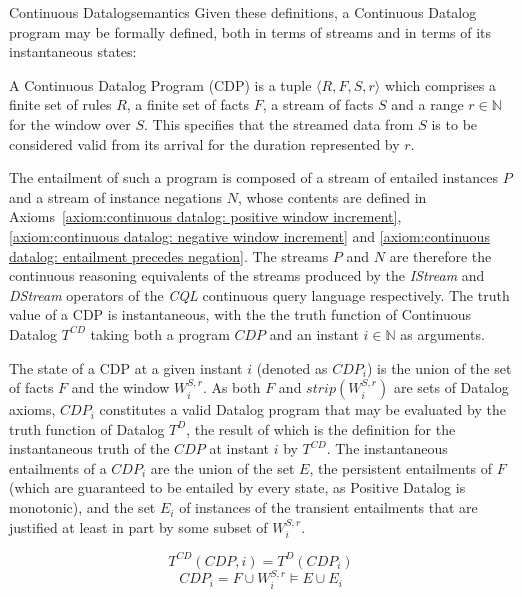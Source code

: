 \begin{nestedsection}{Continuous Datalog}{semantics}
Given these definitions, a Continuous Datalog program may be formally
defined, both in terms of streams and in terms of its instantaneous
states:

\begin{definition}
\label{def:continuous datalog: CDP}

A Continuous Datalog Program (CDP) is a tuple $\langle R, F, S, r
\rangle$ which comprises a finite set of rules $R$, a finite set of
facts $F$, a stream of facts $S$ and a range $r \in \mathbb{N}$ for
the window over $S$. This specifies that the streamed data from $S$ is
to be considered valid from its arrival for the duration represented
by $r$.

The entailment of such a program is composed of a stream of entailed
instances $P$ and a stream of instance negations $N$, whose contents
are defined in 
Axioms~\ref{axiom:continuous datalog: positive window increment}, 
\ref{axiom:continuous datalog: negative window increment} and
\ref{axiom:continuous datalog: entailment precedes negation}. 
The streams $P$ and $N$ are therefore the continuous
reasoning equivalents of the streams produced by the \emph{IStream}
and \emph{DStream} operators of the \emph{CQL} continuous query
language \citep{CQL} respectively.  The truth value of a CDP is
instantaneous, with the the truth function of Continuous Datalog
$T^{CD}$ taking both a program ${CDP}$ and an instant ${i \in
  \mathbb{N}}$ as arguments.
\end{definition}

\begin{definition}
\label{def:continuous datalog: CDPt}

The state of a CDP at a given instant $i$ (denoted as ${CDP_{i}}$) is
the union of the set of facts $F$ and the window $W^{S,r}_{i}$.  As both $F$
and ${strip( W^{S,r}_{i} )}$ are sets of Datalog axioms, 
${CDP_{i}}$ constitutes a valid Datalog program that may be evaluated
by the truth function of Datalog $T^{D}$, the result of which is the
definition for the instantaneous truth of the ${CDP}$ at instant $i$
by $T^{CD}$.  The instantaneous entailments of a $CDP_{i}$ are the
union of the set $E$, the persistent entailments of $F$ (which are
guaranteed to be entailed by every state, as Positive Datalog is
monotonic), and the set $E_{i}$ of instances of the transient
entailments that are justified at least in part by some subset of
$W^{S,r}_{i}$.

\begin{equation*}
T^{CD} \left( CDP, i \right) = T^{D} \left( CDP_{i} \right)
\end{equation*}
\begin{equation*}
CDP_{i} = F \cup W^{S,r}_{i} \vDash E \cup E_{i}
\end{equation*}
\end{definition}



\end{nestedsection}
